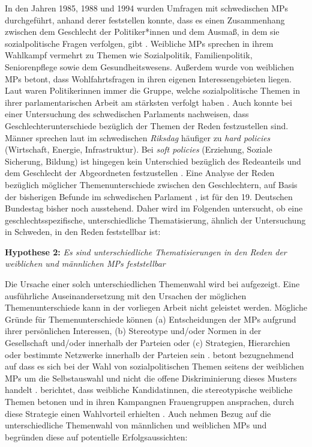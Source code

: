 \documentclass[12pt, 
    twoside=false, 
    bibliography=totoc, 
    numbers=endperiod, 
    headings=normal, 
    toc=chapterentrydotfill
    ]{scrbook}
\begin{document}
In den Jahren 1985, 1988 und 1994 wurden Umfragen mit schwedischen MPs durchgeführt, anhand derer \textcite[81]{wangnerud_2000} feststellen konnte, dass es einen Zusammenhang zwischen dem Geschlecht der Politiker*innen und dem Ausmaß, in dem sie sozialpolitische Fragen verfolgen, gibt \parencites[506]{back_2014}[82]{wangnerud_2000}. Weibliche MPs sprechen in ihrem Wahlkampf vermehrt zu Themen wie Sozialpolitik, Familienpolitik, Seniorenpflege sowie dem Gesundheitswesens. Außerdem wurde von weiblichen MPs betont, dass Wohlfahrtsfragen in ihren eigenen Interessengebieten liegen. Laut \textcite[82]{wangnerud_2000} waren Politikerinnen immer die Gruppe, welche sozialpolitische Themen in ihrer parlamentarischen Arbeit am stärksten verfolgt haben \parencites[vgl.][507]{back_2014}.
Auch \textcite{back_2014} konnte bei einer Untersuchung des schwedischen Parlaments nachweisen, dass Geschlechterunterschiede bezüglich der Themen der Reden festzustellen sind. Männer sprechen laut \textcite{back_2014} im schwedischen \emph{Riksdag} häufiger zu \emph{hard policies} (Wirtschaft, Energie, Infrastruktur). Bei \emph{soft policies} (Erziehung, Soziale Sicherung, Bildung) ist hingegen kein Unterschied bezüglich des Redeanteils und dem Geschlecht der Abgeordneten festzustellen \parencite[514f.]{back_2014}. Eine Analyse der Reden bezüglich möglicher Themenunterschiede zwischen den Geschlechtern, auf Basis der bisherigen Befunde im schwedischen Parlament \parencites{wangnerud_2000}{wangnerud_2009}{back_2014}, ist für den 19. Deutschen Bundestag bisher noch ausstehend. Daher wird im Folgenden untersucht, ob eine geschlechtsspezifische, unterschiedliche Thematisierung, ähnlich der Untersuchung in Schweden, in den Reden feststellbar ist: 

\textbf{Hypothese 2:} \emph{Es sind unterschiedliche Thematisierungen in den Reden der weiblichen und männlichen MPs feststellbar}

Die Ursache einer solch unterschiedlichen Themenwahl wird bei \textcite{back_2014} aufgezeigt. Eine ausführliche Auseinandersetzung mit den Ursachen der möglichen Themenunterschiede kann in der vorliegen Arbeit nicht geleistet werden. Mögliche Gründe für Themenunterschiede können (a) Entscheidungen der MPs aufgrund ihrer persönlichen Interessen, (b) Stereotype und/oder Normen in der Gesellschaft und/oder innerhalb der Parteien oder (c) Strategien, Hierarchien oder bestimmte Netzwerke innerhalb der Parteien sein \parencites[507]{back_2014}. \textcite [250]{ennser-jedenastik_2017} betont bezugnehmend auf \textcites{baekgaard_2012}{thomas_1994} dass es sich bei der Wahl von sozialpolitischen Themen seitens der weiblichen MPs um die Selbstauswahl und nicht die offene Diskriminierung dieses Musters handelt \parencite[250]{ennser-jedenastik_2017}. \textcite{herrnson_2003} berichtet, dass weibliche Kandidatinnen, die stereotypische weibliche Themen betonen und in ihren Kampangnen Frauengruppen ansprachen, durch diese Strategie einen Wahlvorteil erhielten \parencite[250]{ennser-jedenastik_2017}. Auch \textcite{celis_2018} nehmen Bezug auf die unterschiedliche Themenwahl von männlichen und weiblichen MPs und begründen diese auf potentielle Erfolgsaussichten:
\end{document}
